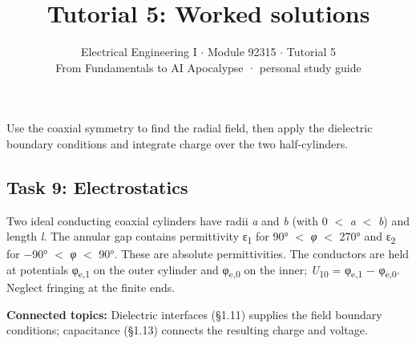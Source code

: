 \documentclass[11pt]{article}
\title{\sffamily\bfseries\color{FAUblue}Tutorial 5: Worked solutions}
\author{Electrical Engineering I \ensuremath{\cdot} Module 92315 \ensuremath{\cdot} Tutorial 5\\[2pt]\small From Fundamentals to AI Apocalypse · personal study guide}
\date{}
\begin{document}
\maketitle
\begingroup\footnotesize\setlength{\parskip}{0pt}\tableofcontents\endgroup
\clearpage

{\large Use the coaxial symmetry to find the radial field, then apply the dielectric boundary conditions and integrate charge over the two half-cylinders.}


\begin{keepsection}
\section{Task 9: Electrostatics}

Two ideal conducting coaxial cylinders have radii \textit{a} and \textit{b} (with 0 \ensuremath{<} \textit{a} \ensuremath{<} \textit{b}) and length \textit{l}. The annular gap contains permittivity ε\textsubscript{1} for 90° \ensuremath{<} \textit{φ} \ensuremath{<} 270° and ε\textsubscript{2} for \ensuremath{-}90° \ensuremath{<} \textit{φ} \ensuremath{<} 90°. These are absolute permittivities. The conductors are held at potentials φ\textsubscript{e,1} on the outer cylinder and φ\textsubscript{e,0} on the inner; \textit{U}\textsubscript{10} = φ\textsubscript{e,1} \ensuremath{-} φ\textsubscript{e,0}. Neglect fringing at the finite ends.

\textbf{Connected topics:} Dielectric interfaces (§1.11) supplies the field boundary conditions; capacitance (§1.13) connects the resulting charge and voltage.


\end{keepsection}
\end{document}
